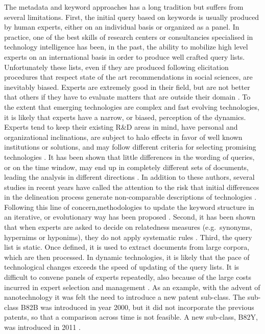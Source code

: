 \documentclass[]{book}
\begin{document}
The metadata and keyword approaches has a long tradition but suffers
from several limitations. First, the initial query based on keywords is
usually produced by human experts, either on an individual basis or
organized as a panel. In practice, one of the best skills of research
centers or consultancies specialised in technology intelligence has
been, in the past, the ability to mobilize high level experts on an
international basis in order to produce well crafted query lists.
Unfortunately these lists, even if they are produced following
elicitation procedures that respect state of the art recommendations in
social sciences, are inevitably biased. Experts are extremely good in
their field, but are not better that others if they have to evaluate
matters that are outside their domain \citep{burgman2015trusting}. To
the extent that emerging technologies are complex and fast evolving
technologies, it is likely that experts have a narrow, or biased,
perception of the dynamics. Experts tend to keep their existing R\&D
areas in mind, have personal and organizational inclinations, are
subject to halo effects in favor of well known institutions or
solutions, and may follow different criteria for selecting promising
technologies \citep{kim2017novel}. It has been shown that little
differences in the wording of queries, or on the time window, may end up
in completely different sets of documents, leading the analysis in
different directions \citep{bassecoulard2007mapping}. In addition to
these authors, several studies in recent years have called the attention
to the risk that initial differences in the delineation process generate
non-comparable descriptions of technologies
\citep{mogoutov2007data, youtie2008nanotechnology, ghazinoory2013application}.
Following this line of concern,methodologies to update the keyword
structure in an iterative, or evolutionary way has been proposed
\citep{mogoutov2007data}. Second, it has been shown that when experts
are asked to decide on relatedness measures (e.g.~synonyms, hypernims or
hyponims), they do not apply systematic rules
\citep{tseng2007text, noh2015keyword}. Third, the query list is static.
Once defined, it is used to extract documents from large corpora, which
are then processed. In dynamic technologies, it is likely that the pace
of technological changes exceeds the speed of updating of the query
lists. It is difficult to convene panels of experts repeatedly, also
because of the large costs incurred in expert selection and management
\citep{tseng2007text}. As an example, with the advent of nanotechnology
it was felt the need to introduce a new patent sub-class. The sub-class
B82B was introduced in year 2000, but it did not incorporate the
previous patents, so that a comparison across time is not feasible. A
new sub-class, B82Y, was introduced in 2011
\citep{kreuchauff2017patent}.
\end{document}
